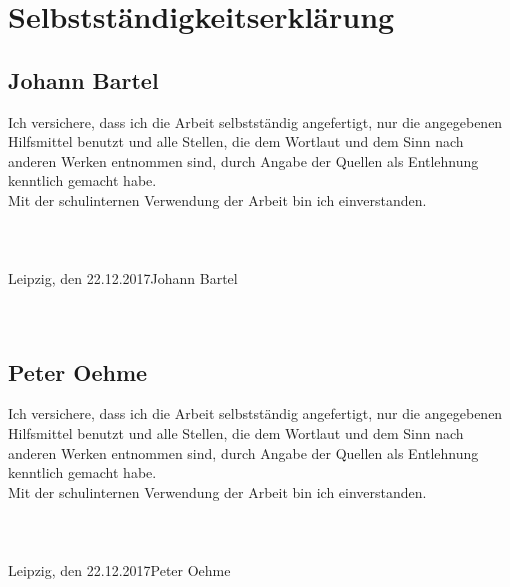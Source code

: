 \chapter{Selbstständigkeitserklärung}
\section*{Johann Bartel}
Ich versichere, dass ich die Arbeit selbstständig angefertigt, nur die angegebenen Hilfsmittel benutzt und alle Stellen, die dem Wortlaut und dem Sinn nach anderen Werken entnommen sind, durch Angabe der Quellen als Entlehnung kenntlich gemacht habe.\\
Mit der schulinternen Verwendung der Arbeit bin ich einverstanden.\\\\\\\\
Leipzig, den 22.12.2017\tab \tab Johann Bartel \\\\\\

\section*{Peter Oehme}
Ich versichere, dass ich die Arbeit selbstständig angefertigt, nur die angegebenen Hilfsmittel benutzt und alle Stellen, die dem Wortlaut und dem Sinn nach anderen Werken entnommen sind, durch Angabe der Quellen als Entlehnung kenntlich gemacht habe.\\
Mit der schulinternen Verwendung der Arbeit bin ich einverstanden.\\\\\\\\
Leipzig, den 22.12.2017\tab \tab Peter Oehme
